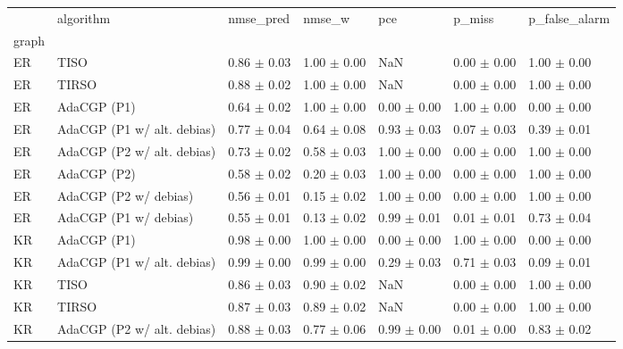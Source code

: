 \begin{tabular}{lllllll}
\toprule
{} &                   algorithm &        nmse_pred &           nmse_w &              pce &           p_miss &    p_false_alarm \\
graph  &                             &                  &                  &                  &                  &                  \\
\midrule
ER     &                        TISO &  0.86 $\pm$ 0.03 &  1.00 $\pm$ 0.00 &              NaN &  0.00 $\pm$ 0.00 &  1.00 $\pm$ 0.00 \\
ER     &                       TIRSO &  0.88 $\pm$ 0.02 &  1.00 $\pm$ 0.00 &              NaN &  0.00 $\pm$ 0.00 &  1.00 $\pm$ 0.00 \\
ER     &                 AdaCGP (P1) &  0.64 $\pm$ 0.02 &  1.00 $\pm$ 0.00 &  0.00 $\pm$ 0.00 &  1.00 $\pm$ 0.00 &  0.00 $\pm$ 0.00 \\
ER     &  AdaCGP (P1 w/ alt. debias) &  0.77 $\pm$ 0.04 &  0.64 $\pm$ 0.08 &  0.93 $\pm$ 0.03 &  0.07 $\pm$ 0.03 &  0.39 $\pm$ 0.01 \\
ER     &  AdaCGP (P2 w/ alt. debias) &  0.73 $\pm$ 0.02 &  0.58 $\pm$ 0.03 &  1.00 $\pm$ 0.00 &  0.00 $\pm$ 0.00 &  1.00 $\pm$ 0.00 \\
ER     &                 AdaCGP (P2) &  0.58 $\pm$ 0.02 &  0.20 $\pm$ 0.03 &  1.00 $\pm$ 0.00 &  0.00 $\pm$ 0.00 &  1.00 $\pm$ 0.00 \\
ER     &       AdaCGP (P2 w/ debias) &  0.56 $\pm$ 0.01 &  0.15 $\pm$ 0.02 &  1.00 $\pm$ 0.00 &  0.00 $\pm$ 0.00 &  1.00 $\pm$ 0.00 \\
ER     &       AdaCGP (P1 w/ debias) &  0.55 $\pm$ 0.01 &  0.13 $\pm$ 0.02 &  0.99 $\pm$ 0.01 &  0.01 $\pm$ 0.01 &  0.73 $\pm$ 0.04 \\
KR     &                 AdaCGP (P1) &  0.98 $\pm$ 0.00 &  1.00 $\pm$ 0.00 &  0.00 $\pm$ 0.00 &  1.00 $\pm$ 0.00 &  0.00 $\pm$ 0.00 \\
KR     &  AdaCGP (P1 w/ alt. debias) &  0.99 $\pm$ 0.00 &  0.99 $\pm$ 0.00 &  0.29 $\pm$ 0.03 &  0.71 $\pm$ 0.03 &  0.09 $\pm$ 0.01 \\
KR     &                        TISO &  0.86 $\pm$ 0.03 &  0.90 $\pm$ 0.02 &              NaN &  0.00 $\pm$ 0.00 &  1.00 $\pm$ 0.00 \\
KR     &                       TIRSO &  0.87 $\pm$ 0.03 &  0.89 $\pm$ 0.02 &              NaN &  0.00 $\pm$ 0.00 &  1.00 $\pm$ 0.00 \\
KR     &  AdaCGP (P2 w/ alt. debias) &  0.88 $\pm$ 0.03 &  0.77 $\pm$ 0.06 &  0.99 $\pm$ 0.00 &  0.01 $\pm$ 0.00 &  0.83 $\pm$ 0.02 \\

\end{tabular}
